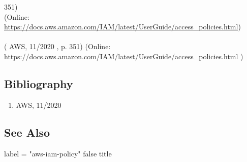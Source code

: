 351)\\ (Online: \url{https://docs.aws.amazon.com/IAM/latest/UserGuide/access_policies.html})  \paragraph{} (  AWS, 11/2020  , p. 351)  (Online:  https://docs.aws.amazon.com/IAM/latest/UserGuide/access\_policies.html  )  \subsection*{Bibliography } \begin{enumerate} \item  AWS, 11/2020    \end{enumerate} \subsection*{See Also } label = "aws-iam-policy"  false  title  